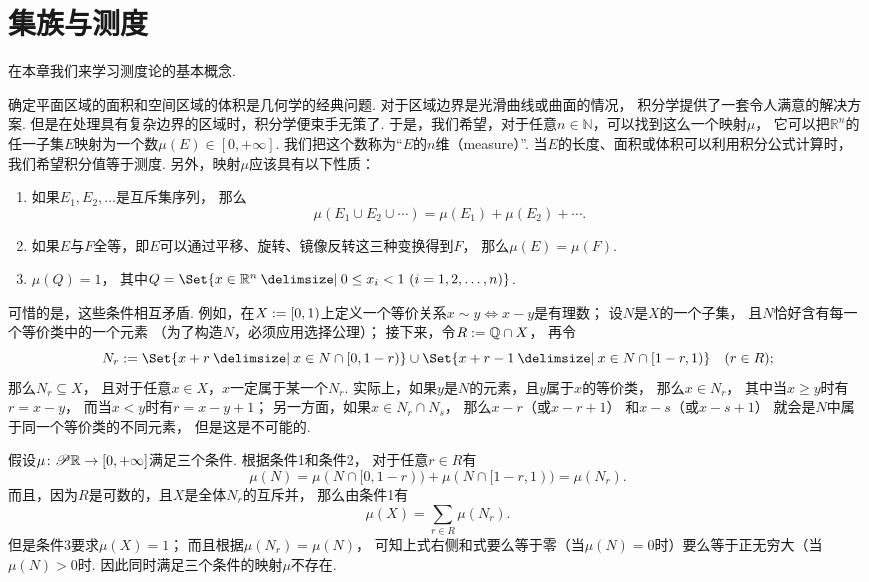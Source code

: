 \chapter{集族与测度}
在本章我们来学习测度论的基本概念.

确定平面区域的面积和空间区域的体积是几何学的经典问题.
对于区域边界是光滑曲线或曲面的情况，
积分学提供了一套令人满意的解决方案.
但是在处理具有复杂边界的区域时，积分学便束手无策了.
于是，我们希望，对于任意\(n\in\mathbb{N}\)，可以找到这么一个映射\(\mu\)，
它可以把\(\mathbb{R}^n\)的任一子集\(E\)映射为一个数\(\mu(E) \in [0,+\infty]\).
我们把这个数称为“\(E\)的\(n\)维（measure）”.
当\(E\)的长度、面积或体积可以利用积分公式计算时，
我们希望积分值等于测度.
另外，映射\(\mu\)应该具有以下性质：\begin{enumerate}
	\item 如果\(E_1,E_2,\dotsc\)是互斥集序列，
	那么\begin{equation*}
		\mu(E_1 \cup E_2 \cup \dotsb)
		= \mu(E_1) + \mu(E_2) + \dotsb.
	\end{equation*}

	\item 如果\(E\)与\(F\)全等，即\(E\)可以通过平移、旋转、镜像反转这三种变换得到\(F\)，
	那么\(\mu(E) = \mu(F)\).

	\item \(\mu(Q)=1\)，
	其中\(Q = \Set{ x\in\mathbb{R}^n \given 0\leq x_i<1\ (i=1,2,\dotsc,n) }\).
\end{enumerate}
可惜的是，这些条件相互矛盾.
例如，在\(X := [0,1)\)上定义一个等价关系\(x \sim y \iff \text{$x-y$是有理数}\)；
设\(N\)是\(X\)的一个子集，
且\(N\)恰好含有每一个等价类中的一个元素
（为了构造\(N\)，必须应用选择公理）；
接下来，令\(R := \mathbb{Q} \cap X\)，
再令\begin{equation*}
	N_r \defeq
	\Set{
		x + r
		\given
		x \in N \cap [0,1-r)
	}
	\cup
	\Set{
		x + r - 1
		\given
		x \in N \cap [1-r,1)
	}
	\quad(r \in R);
\end{equation*}
那么\(N_r \subseteq X\)，
且对于任意\(x \in X\)，\(x\)一定属于某一个\(N_r\).
实际上，如果\(y\)是\(N\)的元素，且\(y\)属于\(x\)的等价类，
那么\(x \in N_r\)，
其中当\(x \geq y\)时有\(r = x - y\)，
而当\(x < y\)时有\(r = x - y + 1\)；
另一方面，如果\(x \in N_r \cap N_s\)，
那么\(x - r\)（或\(x - r + 1\)）
和\(x - s\)（或\(x - s + 1\)）
就会是\(N\)中属于同一个等价类的不同元素，
但是这是不可能的.

假设\(\mu\colon \mathscr{P}\mathbb{R} \to [0,+\infty]\)满足三个条件.
根据条件1和条件2，
对于任意\(r \in R\)有\begin{equation*}
	\mu(N)
	= \mu(N \cap [0,1-r))
	+ \mu(N \cap [1-r,1))
	= \mu(N_r).
\end{equation*}
而且，因为\(R\)是可数的，且\(X\)是全体\(N_r\)的互斥并，
那么由条件1有\begin{equation*}
	\mu(X) = \sum_{r \in R} \mu(N_r).
\end{equation*}
但是条件3要求\(\mu(X) = 1\)；
而且根据\(\mu(N_r) = \mu(N)\)，
可知上式右侧和式要么等于零（当\(\mu(N) = 0\)时）要么等于正无穷大（当\(\mu(N) > 0\)时.
因此同时满足三个条件的映射\(\mu\)不存在.

